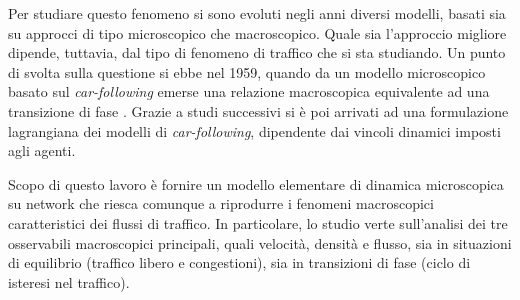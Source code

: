 \documentclass[../main.tex]{subfiles}
\begin{document}
Per studiare questo fenomeno si sono evoluti negli anni diversi modelli, basati sia su approcci di tipo microscopico che macroscopico.
Quale sia l'approccio migliore dipende, tuttavia, dal tipo di fenomeno di traffico che si sta studiando.
Un punto di svolta sulla questione si ebbe nel 1959, quando da un modello microscopico basato sul \emph{car-following} emerse una relazione macroscopica equivalente ad una transizione di fase \cite{gazis2002origins}.
Grazie a studi successivi si \`e poi arrivati ad una formulazione lagrangiana dei modelli di \emph{car-following}, dipendente dai vincoli dinamici imposti agli agenti.

Scopo di questo lavoro \`e fornire un modello elementare di dinamica microscopica su network che riesca comunque a riprodurre i fenomeni macroscopici caratteristici dei flussi di traffico.
In particolare, lo studio verte sull'analisi dei tre osservabili macroscopici principali, quali velocit\`a, densit\`a e flusso, sia in situazioni di equilibrio (traffico libero e congestioni), sia in transizioni di fase (ciclo di isteresi nel traffico).
\end{document}
